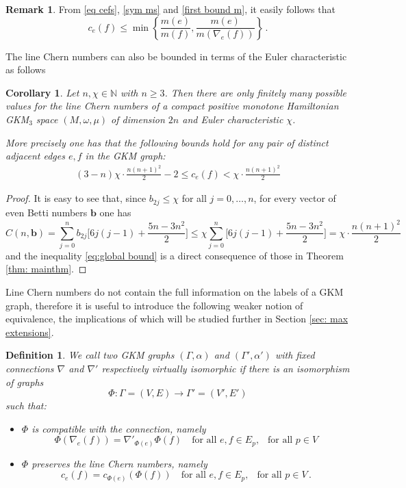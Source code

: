 \documentclass[12pt,a4paper]{amsart}
\newcommand{\NN}{\mathbb{N}}
\newtheorem{cor}[thm]{Corollary}
\theoremstyle{plain}
\newtheorem{defn}[thm]{Definition}
\theoremstyle{definition}
\newtheorem{rem}[thm]{Remark}
\begin{document}
\begin{rem}
From \eqref{eq cefs}, \eqref{sym ms} and \eqref{first bound m}, it easily follows that 
$$
c_e(f)\leq \min \left\{\frac{m(e)}{m(f)},\frac{m(e)}{m(\nabla_e(f))}\right\}\,.
$$
\end{rem}
The line Chern numbers can also be bounded in terms of the Euler characteristic as follows

\begin{cor}\label{global bound}
Let $n,\chi \in \NN$ with $n\geq 3$. Then there are only finitely many possible values for the line Chern numbers of a compact positive monotone
Hamiltonian GKM$_3$ space $(M, \omega, \mu)$ of dimension $2n$ and Euler characteristic $\chi$. 

More precisely one has that the following bounds hold for any pair of distinct adjacent edges $e,f$ in the GKM graph:
\begin{align}
\label{eq:global bound} (3-n)\chi\cdot \frac{n(n+1)^2}{2}-2\leq c_e(f)< \chi\cdot\frac{n(n+1)^2}{2}
\end{align}

\end{cor}
\begin{proof}
It is easy to see that, since $b_{2j}\leq \chi$ for all $j=0,\ldots,n$, for every vector of even Betti numbers $\mathbf{b}$ one has
\begin{equation}\label{bound C and chi}
C(n,\mathbf{b})=\sum_{j=0}^n b_{2j}\Big[ 6j(j-1)+\frac{5n-3n^2}{2}\Big]\leq \chi \sum_{j=0}^n \Big[ 6j(j-1)+\frac{5n-3n^2}{2}\Big] = \chi\cdot\frac{n(n+1)^2}{2}
\end{equation}
and the inequality \eqref{eq:global bound} is a direct consequence of those in Theorem \ref{thm: mainthm}.
\end{proof}


Line Chern numbers do not contain the full information on the labels of a GKM graph, therefore it is useful to introduce the following weaker notion of equivalence, the implications of which will be studied further in Section \ref{sec: max extensions}.

\begin{defn}
We call two GKM graphs $(\Gamma,\alpha)$ and $(\Gamma',\alpha')$ with fixed connections
$\nabla$ and $\nabla'$ respectively
\emph{virtually isomorphic} if there is an isomorphism of graphs
$$\Phi\colon \Gamma=(V,E)\rightarrow \Gamma'=(V',E')$$  such that:
\begin{itemize}
\item[(i)] $\Phi$ is \emph{compatible with the connection}, namely 
$$
\Phi(\nabla_e(f))=\nabla'_{\Phi(e)}\Phi(f)\quad\text{for all }e,f\in E_p,\;\;\ \text{for all }p\in V
$$
\item[(ii)] $\Phi$ \emph{preserves the line Chern numbers}, namely
$$
c_{e}(f)=c_{\Phi(e)}(\Phi(f)) \quad\text{for all }e,f\in E_p,\;\;\ \text{for all }p\in V\,.
$$
 \end{itemize}
\end{defn}
\end{document}
